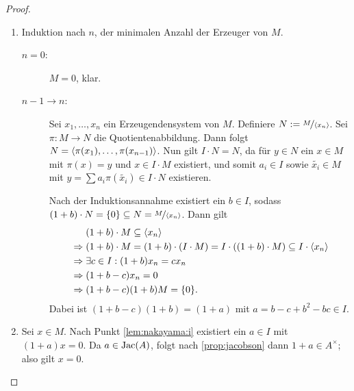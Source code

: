 \documentclass[12pt,a4paper]{scrartcl}
\theoremstyle{cplain}
\theoremstyle{cdef}
\begin{document}
\begin{proof}
	\leavevmode
	\begin{enumerate}[label=\ref{lem:nakayama:\roman*}]
		\item Induktion nach $n$, der minimalen Anzahl der Erzeuger von $M$.
        \begin{description}
            \item[$n = 0$:] $M = 0$, klar.
            \item[$n-1\to n$:] Sei $x_1,\dots, x_n$ ein Erzeugendensystem von $M$. Definiere $N := \nicefrac{M}{\langle x_n\rangle}$. Sei $\pi \colon M\to N$ die Quotientenabbildung. Dann folgt $N = \langle\pi(x_1),\dots,\pi(x_{n-1})\rangle$. Nun gilt $I\cdot N = N$, da für $y\in N$ ein $x\in M$ mit $\pi(x) = y$ und $x\in I\cdot M$ existiert, und somit $a_i\in I$ sowie $\tilde{x_i}\in M$ mit $y =\sum a_i\pi(\tilde{x_i})\in I\cdot N$ existieren.
		
            Nach der Induktionsannahme existiert ein $b\in I$, sodass $(1+b)\cdot N = \{0\}\subseteq N = \nicefrac{M}{\langle x_n\rangle}$. Dann gilt
            \begin{align*}
                &\phantom{{}\Rightarrow{}}(1+b)\cdot M\subseteq \<x_n\>\\
                &\Rightarrow (1+b)\cdot M = (1+b)\cdot (I\cdot M) = I\cdot((1+b)\cdot M)\subseteq I \cdot \<x_n\>\\
                &\Rightarrow \exists c\in I: (1+b) x_n = cx_n \\
                &\Rightarrow (1+b-c)x_n = 0\\
                &\Rightarrow (1+b-c)(1+b)M = \{0\}.
            \end{align*}
            Dabei ist $(1+b-c)(1+b) = (1+a)$ mit $a = b-c+b^2-bc\in I$.
        \end{description}
        \item Sei $x\in M$. Nach Punkt \ref{lem:nakayama:i} existiert ein $a\in I$ mit $(1+a)x = 0$. Da $a\in \operatorname{Jac}(A)$, folgt nach \cref{prop:jacobson} dann $1+a\in A^{\times}$; also gilt $x = 0$.
        \qedhere
	\end{enumerate}
\end{proof}

\end{document}
